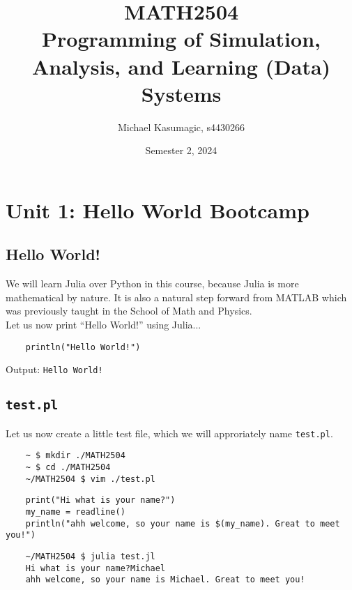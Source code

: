 \documentclass{report}
\title{\Huge MATH2504\\Programming of Simulation, Analysis, and Learning (Data) Systems}
\author{\huge Michael Kasumagic, s4430266}
\date{\huge Semester 2, 2024}
\begin{document}
\maketitle
\newpage%
\tableofcontents
\pagebreak

\chapter{Unit 1: Hello World Bootcamp}
\section{Hello World!}
We will learn Julia over Python in this course, because Julia is more mathematical by nature. It is also a natural step forward from MATLAB which was previously taught in the School of Math and Physics. \\

Let us now print ``Hello World!'' using Julia...
\begin{lstlisting}
	println("Hello World!")
\end{lstlisting}
Output: \verb|Hello World!|


\section{\texttt{test.pl}}
Let us now create a little test file, which we will approriately name \verb|test.pl|.
\begin{verbatim}
    ~ $ mkdir ./MATH2504
    ~ $ cd ./MATH2504
    ~/MATH2504 $ vim ./test.pl
\end{verbatim}

\begin{lstlisting}
	print("Hi what is your name?")
	my_name = readline()
	println("ahh welcome, so your name is $(my_name). Great to meet you!")
\end{lstlisting}


\begin{verbatim}
	~/MATH2504 $ julia test.jl
	Hi what is your name?Michael
	ahh welcome, so your name is Michael. Great to meet you!
\end{verbatim}
\end{document}
